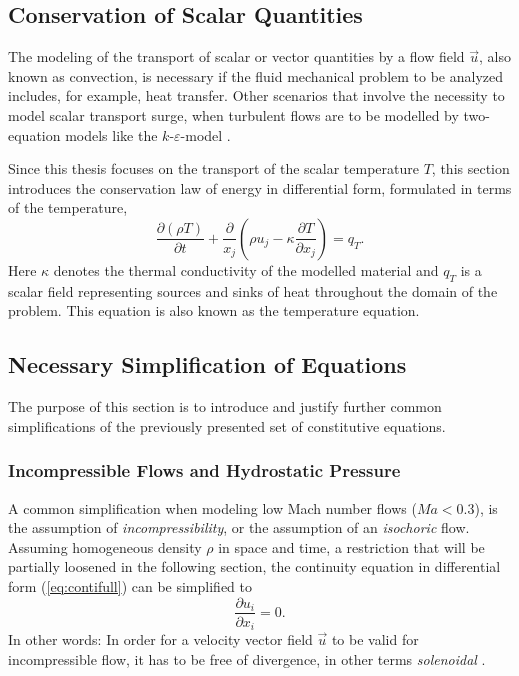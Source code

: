 \subsection{Conservation of Scalar Quantities}

The modeling of the transport of scalar or vector quantities by a flow field \(\vec{u}\), also known as convection, is necessary if the fluid mechanical problem to be analyzed includes, for example, heat transfer. Other scenarios that involve the necessity to model scalar transport surge, when turbulent flows are to be modelled by two-equation models like the \(k\)-\(\varepsilon\)-model \cite{pope00}. 
    
Since this thesis focuses on the transport of the scalar temperature \(T\), this section introduces the conservation law of energy in differential form, formulated in terms of the temperature,
\begin{displaymath}
  \frac{\partial \left(\rho T \right)}{\partial t} + \frac{\partial}{x_j} \left( \rho u_j - \kappa \frac{\partial T}{\partial x_j} \right) = q_T.
\end{displaymath}
Here \(\kappa\) denotes the thermal conductivity of the modelled material and \(q_T\) is a scalar field representing sources and sinks of heat throughout the domain of the problem. This equation is also known as the temperature equation.


\subsection{Necessary Simplification of Equations}

The purpose of this section is to introduce and justify further common simplifications of the previously presented set of constitutive equations. 

\subsubsection{Incompressible Flows and Hydrostatic Pressure}

A common simplification when modeling low Mach number flows (\(Ma < 0.3\)), is the assumption of \emph{incompressibility}, or the assumption of an \emph{isochoric} flow. Assuming homogeneous density \(\rho\) in space and time, a restriction that will be partially loosened in the following section, the continuity equation in differential form (\ref{eq:contifull}) can be simplified to
\begin{displaymath}
  \frac{\partial u_i}{\partial x_i} = 0.
\end{displaymath}
In other words: In order for a velocity vector field \(\vec{u}\) to be valid for incompressible flow, it has to be free of divergence, in other terms \emph{solenoidal} \cite{spurk10,aris62}.

